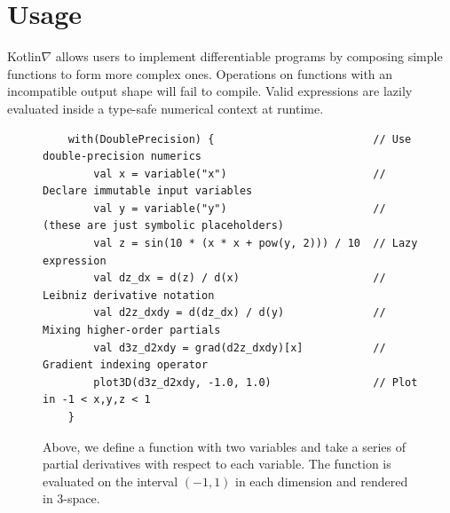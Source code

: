 \documentclass{article}
\begin{document}
\section{Usage}

Kotlin$\nabla$ allows users to implement differentiable programs by composing simple functions to form more complex ones. Operations on functions with an incompatible output shape will fail to compile. Valid expressions are lazily evaluated inside a type-safe numerical context at runtime.

\begin{figure}[!htb]
    \begin{lstlisting}
    with(DoublePrecision) {                         // Use double-precision numerics
        val x = variable("x")                       // Declare immutable input variables
        val y = variable("y")                       // (these are just symbolic placeholders)
        val z = sin(10 * (x * x + pow(y, 2))) / 10  // Lazy expression
        val dz_dx = d(z) / d(x)                     // Leibniz derivative notation
        val d2z_dxdy = d(dz_dx) / d(y)              // Mixing higher-order partials
        val d3z_d2xdy = grad(d2z_dxdy)[x]           // Gradient indexing operator
        plot3D(d3z_d2xdy, -1.0, 1.0)                // Plot in -1 < x,y,z < 1
    }
    \end{lstlisting}

    \caption{Above, we define a function with two variables and take a series of partial derivatives with respect to each variable. The function is evaluated on the interval $(-1, 1)$ in each dimension and rendered in 3-space.}
    \label{label:fig1}
\end{figure}
\end{document}
